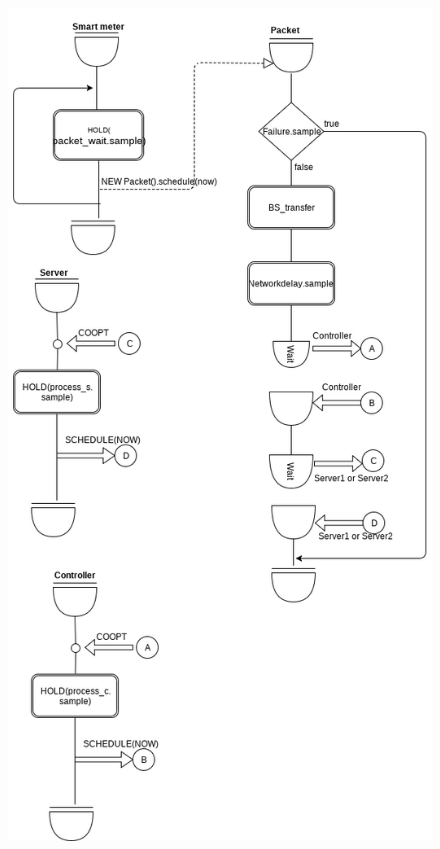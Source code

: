 \documentclass[11pt]{article}
\begin{document}
\begin{figure}
	\includegraphics[width=\textwidth,height=\textheight,keepaspectratio]{activity_diagram_1.png}
	\centering
\end{figure}

\newpage
\end{document}
